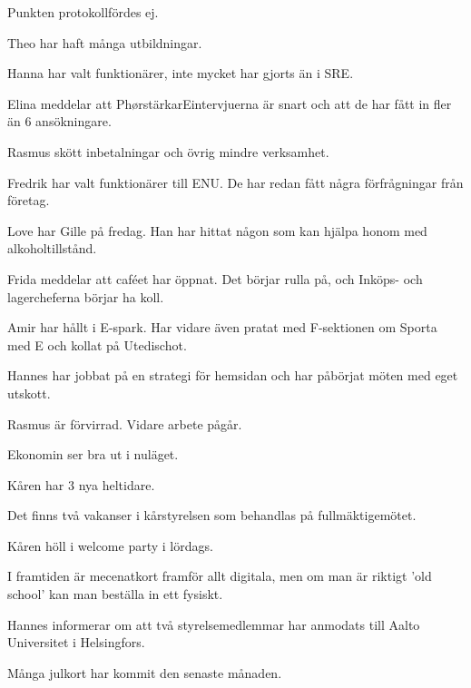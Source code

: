 \documentclass[10pt]{article}
\begin{document}
\begin{paragrafer}
\begin{paragrafer}

Punkten protokollfördes ej.


Theo har haft många utbildningar.

Hanna har valt funktionärer, inte mycket har gjorts än i SRE.

Elina meddelar att PhørstärkarEintervjuerna är snart och att de har fått in fler än 6 ansökningare.

Rasmus skött inbetalningar och övrig mindre verksamhet.

Fredrik har valt funktionärer till ENU. De har redan fått några förfrågningar från företag.

Love har Gille på fredag. Han har hittat någon som kan hjälpa honom med alkoholtillstånd.

Frida meddelar att caféet har öppnat. Det börjar rulla på, och Inköps- och lagercheferna börjar ha koll.

Amir har hållt i E-spark. Har vidare även pratat med F-sektionen om Sporta med E och kollat på Utedischot.

Hannes har jobbat på en strategi för hemsidan och har påbörjat möten med eget utskott.

 
Rasmus är förvirrad. Vidare arbete pågår. 

Ekonomin ser bra ut i nuläget.


Kåren har 3 nya heltidare. 

Det finns två vakanser i kårstyrelsen som behandlas på fullmäktigemötet. 

Kåren höll i welcome party i lördags. 

I framtiden är mecenatkort framför allt digitala, men om man är riktigt 'old school' kan man beställa in ett fysiskt. 


Hannes informerar om att två styrelsemedlemmar har anmodats till Aalto Universitet i Helsingfors.

Många julkort har kommit den senaste månaden.

\end{paragrafer}



\end{paragrafer}
\end{document}
